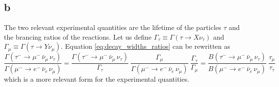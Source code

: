 \subsection*{b}
The two relevant experimental quantities are the lifetime of the particles $\tau$ and the brancing ratios of the reactions. Let us define
$\Gamma_{\tau} \equiv \Gamma(\tau \to X \nu_{\tau})$ and $\Gamma_{\mu} \equiv \Gamma(\tau \to Y \nu_{\mu})$. Equation \ref{eq:decay_widths_ratios} 
can be rewritten as 
\begin{equation*}
    \frac{\Gamma\left(\tau^- \rightarrow \mu^- \, \bar\nu_{\mu} \, \nu_{\tau}\right)}{\Gamma\left( \mu^- \rightarrow e^- \, \bar\nu_e \, \nu_{\mu}\right)} =
    \frac{\Gamma\left(\tau^- \rightarrow \mu^- \, \bar\nu_{\mu} \, \nu_{\tau}\right)}{\Gamma_{\tau}} \
    \frac{\Gamma_\mu}{\Gamma\left( \mu^- \rightarrow e^- \, \bar\nu_e \, \nu_{\mu}\right)} \
    \frac{\Gamma_{\tau}}{\Gamma_{\mu}} = 
    \frac{B\left(\tau^- \rightarrow \mu^- \, \bar\nu_{\mu} \, \nu_{\tau}\right)}{B\left( \mu^- \rightarrow e^- \, \bar\nu_e \, \nu_{\mu}\right)} \ 
    \frac{\tau_{\mu}}{\tau_{\tau}}
\end{equation*}
which is a more relevant form for the experimental quantities.